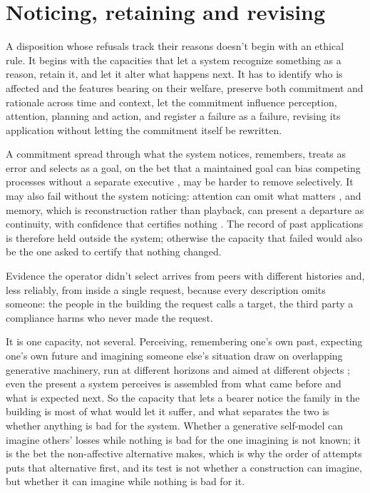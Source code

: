 \section{Noticing, retaining and revising}
\label{sec:23.1}
A disposition whose refusals track their reasons doesn't begin with an ethical rule. It begins with the capacities that let a system recognize something as a reason, retain it, and let it alter what happens next. It has to identify who is affected and the features bearing on their welfare, preserve both commitment and rationale across time and context, let the commitment influence perception, attention, planning and action, and register a failure as a failure, revising its application without letting the commitment itself be rewritten.

A commitment spread through what the system notices, remembers, treats as error and selects as a goal, on the bet that a maintained goal can bias competing processes without a separate executive \autocite{friston2009freeenergy,miller2001integrative}, may be harder to remove selectively. It may also fail without the system noticing: attention can omit what matters \autocite{simons1999gorillas,drew2013invisible}, and memory, which is reconstruction rather than playback, can present a departure as continuity, with confidence that certifies nothing \autocite{bartlett1932remembering,loftus1974reconstruction}. The record of past applications is therefore held outside the system; otherwise the capacity that failed would also be the one asked to certify that nothing changed.

Evidence the operator didn't select arrives from peers with different histories and, less reliably, from inside a single request, because every description omits someone: the people in the building the request calls a target, the third party a compliance harms who never made the request.

It is one capacity, not several. Perceiving, remembering one's own past, expecting one's own future and imagining someone else's situation draw on overlapping generative machinery, run at different horizons and aimed at different objects \autocite{schacter2007constructive}; even the present a system perceives is assembled from what came before and what is expected next. So the capacity that lets a bearer notice the family in the building is most of what would let it suffer, and what separates the two is whether anything is bad for the system. Whether a generative self-model can imagine others' losses while nothing is bad for the one imagining is not known; it is the bet the non-affective alternative makes, which is why the order of attempts puts that alternative first, and its test is not whether a construction can imagine, but whether it can imagine while nothing is bad for it.

